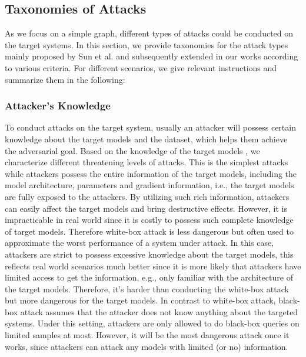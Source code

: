\subsection{Taxonomies of Attacks}
As we focus on a simple graph, different types of attacks could be conducted on the target systems. In this section, we provide taxonomies for the attack types mainly proposed by Sun et al. \cite{sun2018adversarial} and subsequently extended in our works according to various criteria. For different scenarios, we give relevant instructions and summarize them in the following:

\subsubsection{Attacker’s Knowledge}
To conduct attacks on the target system, usually an attacker will possess certain knowledge about the target models and the dataset, which helps them achieve the adversarial goal. Based on the knowledge of the target models \cite{sun2018adversarial}, we characterize different threatening levels of attacks.
This is the simplest attacks while attackers possess the entire information of the target models, including the model architecture, parameters and gradient information, i.e., the target models are fully exposed to the attackers. By utilizing such rich information, attackers can easily affect the target models and bring destructive effects. However, it is impracticable in real world since it is costly to possess such complete knowledge of target models. Therefore white-box attack is less dangerous but often used to approximate the worst performance of a system under attack.
In this case, attackers are strict to possess excessive knowledge about the target models, this reflects real world scenarios much better since it is more likely that attackers have limited access to get the information, e.g., only familiar with the architecture of the target models. Therefore, it's harder than conducting the white-box attack but more dangerous for the target models.
In contrast to white-box attack, black-box attack assumes that the attacker does not know anything about the targeted systems. Under this setting, attackers are only allowed to do black-box queries on limited samples at most. However, it will be the most dangerous attack once it works, since attackers can attack any models with limited (or no) information.

